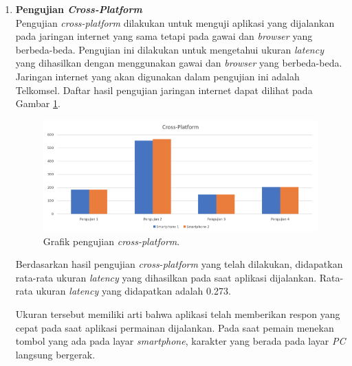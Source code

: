 \begin{enumerate}
	\item \textbf{Pengujian \textit{Cross-Platform}} \\
	Pengujian \textit{cross-platform} dilakukan untuk menguji aplikasi yang dijalankan pada jaringan internet yang sama tetapi pada gawai dan \textit{browser} yang berbeda-beda. Pengujian ini dilakukan untuk mengetahui ukuran \textit{latency} yang dihasilkan dengan menggunakan gawai dan \textit{browser} yang berbeda-beda. Jaringan internet yang akan digunakan dalam pengujian ini adalah Telkomsel. Daftar hasil pengujian jaringan internet dapat dilihat pada Gambar \ref{fig:pengujian_crossplatform}.
	
	\begin{figure}[H]
		\centering
		\includegraphics[scale=0.4]{Gambar/grafik_cross_bar}
		\caption{Grafik pengujian \textit{cross-platform}.}
		\label{fig:pengujian_crossplatform}
	\end{figure}

	Berdasarkan hasil pengujian \textit{cross-platform} yang telah dilakukan, didapatkan rata-rata ukuran \textit{latency} yang dihasilkan pada saat aplikasi dijalankan. Rata-rata ukuran \textit{latency} yang didapatkan adalah 0.273.
	
	Ukuran tersebut memiliki arti bahwa aplikasi telah memberikan respon yang cepat pada saat aplikasi permainan dijalankan. Pada saat pemain menekan tombol yang ada pada layar \textit{smartphone}, karakter yang berada pada layar \textit{PC} langsung bergerak.
	

\end{enumerate}
